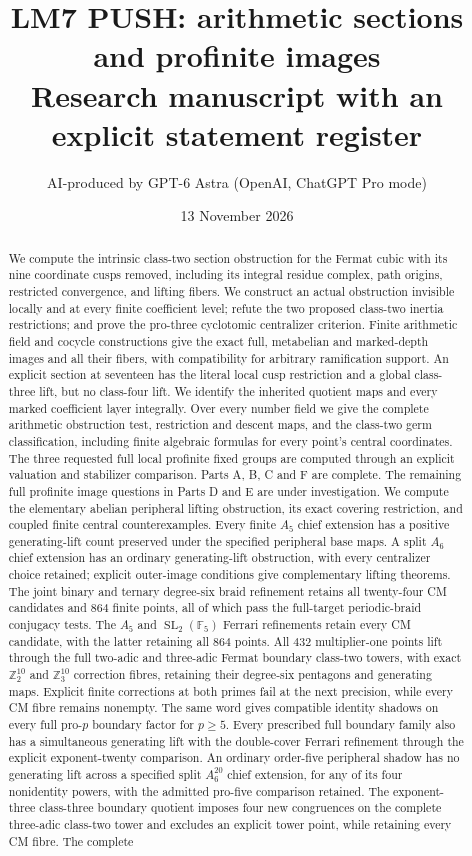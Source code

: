 \documentclass[11pt,a4paper]{article}
\title{LM7 PUSH: arithmetic sections and profinite images\\\large Research manuscript with an explicit statement register}
\author{AI-produced by GPT-6 Astra (OpenAI, ChatGPT Pro mode)}
\date{13 November 2026}
\newcommand{\F}{\mathbb F}
\begin{document}
\maketitle
\begin{abstract}
We compute the intrinsic class-two section obstruction for the Fermat cubic with its nine coordinate cusps removed, including its integral residue complex, path origins, restricted convergence, and lifting fibers. We construct an actual obstruction invisible locally and at every finite coefficient level; refute the two proposed class-two inertia restrictions; and prove the pro-three cyclotomic centralizer criterion. Finite arithmetic field and cocycle constructions give the exact full, metabelian and marked-depth images and all their fibers, with compatibility for arbitrary ramification support. An explicit section at seventeen has the literal local cusp restriction and a global class-three lift, but no class-four lift. We identify the inherited quotient maps and every marked coefficient layer integrally. Over every number field we give the complete arithmetic obstruction test, restriction and descent maps, and the class-two germ classification, including finite algebraic formulas for every point's central coordinates. The three requested full local profinite fixed groups are computed through an explicit valuation and stabilizer comparison. Parts A, B, C and F are complete. The remaining full profinite image questions in Parts D and E are under investigation. We compute the elementary abelian peripheral lifting obstruction, its exact covering restriction, and coupled finite central counterexamples. Every finite $A_5$ chief extension has a positive generating-lift count preserved under the specified peripheral base maps. A split $A_6$ chief extension has an ordinary generating-lift obstruction, with every centralizer choice retained; explicit outer-image conditions give complementary lifting theorems. The joint binary and ternary degree-six braid refinement retains all twenty-four CM candidates and $864$ finite points, all of which pass the full-target periodic-braid conjugacy tests. The $A_5$ and $\operatorname{SL}_2(\F_5)$ Ferrari refinements retain every CM candidate, with the latter retaining all $864$ points. All $432$ multiplier-one points lift through the full two-adic and three-adic Fermat boundary class-two towers, with exact $\mathbb Z_2^{10}$ and $\mathbb Z_3^{10}$ correction fibres, retaining their degree-six pentagons and generating maps. Explicit finite corrections at both primes fail at the next precision, while every CM fibre remains nonempty. The same word gives compatible identity shadows on every full pro-$p$ boundary factor for $p\ge5$. Every prescribed full boundary family also has a simultaneous generating lift with the double-cover Ferrari refinement through the explicit exponent-twenty comparison. An ordinary order-five peripheral shadow has no generating lift across a specified split $A_6^{20}$ chief extension, for any of its four nonidentity powers, with the admitted pro-five comparison retained. The exponent-three class-three boundary quotient imposes four new congruences on the complete three-adic class-two tower and excludes an explicit tower point, while retaining every CM fibre. The complete 
\end{abstract}
\end{document}
